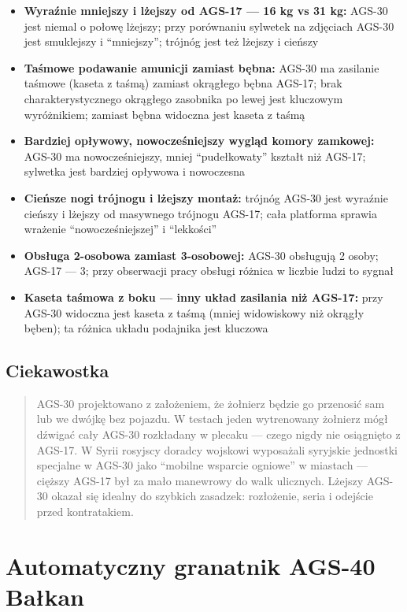 \documentclass[12pt,oneside]{book}
\providecommand{\tightlist}{%
  \setlength{\itemsep}{0pt}\setlength{\parskip}{0pt}}
\begin{document}
\begin{itemize}
\tightlist
\item
  \textbf{Wyraźnie mniejszy i lżejszy od AGS-17 --- 16 kg vs 31 kg:}
  AGS-30 jest niemal o połowę lżejszy; przy porównaniu sylwetek na
  zdjęciach AGS-30 jest smuklejszy i ``mniejszy''; trójnóg jest też
  lżejszy i cieńszy
\item
  \textbf{Taśmowe podawanie amunicji zamiast bębna:} AGS-30 ma zasilanie
  taśmowe (kaseta z taśmą) zamiast okrągłego bębna AGS-17; brak
  charakterystycznego okrągłego zasobnika po lewej jest kluczowym
  wyróżnikiem; zamiast bębna widoczna jest kaseta z taśmą
\item
  \textbf{Bardziej opływowy, nowocześniejszy wygląd komory zamkowej:}
  AGS-30 ma nowocześniejszy, mniej ``pudełkowaty'' kształt niż AGS-17;
  sylwetka jest bardziej opływowa i nowoczesna
\item
  \textbf{Cieńsze nogi trójnogu i lżejszy montaż:} trójnóg AGS-30 jest
  wyraźnie cieńszy i lżejszy od masywnego trójnogu AGS-17; cała
  platforma sprawia wrażenie ``nowocześ­niejszej'' i ``lekkości''
\item
  \textbf{Obsługa 2-osobowa zamiast 3-osobowej:} AGS-30 obsługują 2
  osoby; AGS-17 --- 3; przy obserwacji pracy obsługi różnica w liczbie
  ludzi to sygnał
\item
  \textbf{Kaseta taśmowa z boku --- inny układ zasilania niż AGS-17:}
  przy AGS-30 widoczna jest kaseta z taśmą (mniej widowiskowy niż
  okrągły bęben); ta różnica układu podajnika jest kluczowa
\end{itemize}

\subsection{Ciekawostka}\label{ciekawostka-98}

\begin{quote}
AGS-30 projektowano z założeniem, że żołnierz będzie go przenosić sam
lub we dwójkę bez pojazdu. W testach jeden wytrenowany żołnierz mógł
dźwigać cały AGS-30 rozkładany w plecaku --- czego nigdy nie osiągnięto
z AGS-17. W Syrii rosyjscy doradcy wojskowi wyposażali syryjskie
jednostki specjalne w AGS-30 jako ``mobilne wsparcie ogniowe'' w
miastach --- cięższy AGS-17 był za mało manewrowy do walk ulicznych.
Lżejszy AGS-30 okazał się idealny do szybkich zasadzek: rozłożenie,
seria i odejście przed kontratakiem.
\end{quote}

\section{Automatyczny granatnik AGS-40
Bałkan}\label{automatyczny-granatnik-ags-40-baux142kan}
\end{document}
